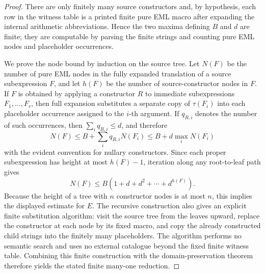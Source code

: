 \begin{proof}
There are only finitely many source constructors and, by hypothesis, each row in
the witness table is a printed finite pure EML macro after expanding the internal
arithmetic abbreviations.  Hence the two maxima defining \(B\) and \(d\) are
finite; they are computable by parsing the finite strings and counting pure EML
nodes and placeholder occurrences.

We prove the node bound by induction on the source tree.  Let \(N(F)\) be the
number of pure EML nodes in the fully expanded translation of a source
subexpression \(F\), and let \(h(F)\) be the number of source-constructor nodes in
\(F\).  If \(F\) is obtained by applying a constructor \(R\) to immediate
subexpressions \(F_1,\ldots,F_r\), then full expansion substitutes a separate
copy of \(\tau(F_i)\) into each placeholder occurrence assigned to the \(i\)-th
argument.  If \(q_{R,i}\) denotes the number of such occurrences, then
\(\sum_i q_{R,i}\le d\), and therefore
\[
  N(F)\le B+\sum_i q_{R,i}N(F_i)
       \le B+d\max_i N(F_i)
\]
with the evident convention for nullary constructors.  Since each proper
subexpression has height at most \(h(F)-1\), iteration along any root-to-leaf path
gives
\[
  N(F)\le B(1+d+d^2+\cdots+d^{h(F)}) .
\]
Because the height of a tree with \(n\) constructor nodes is at most \(n\), this
implies the displayed estimate for \(E\).  The recursive construction also gives
an explicit finite substitution algorithm: visit the source tree from the
leaves upward, replace the constructor at each node by its fixed macro, and copy
the already constructed child strings into the finitely many placeholders.  The
algorithm performs no semantic search and uses no external catalogue beyond the
fixed finite witness table.  Combining this finite construction with the
domain-preservation theorem 
therefore yields the stated finite many-one reduction.
\end{proof}

